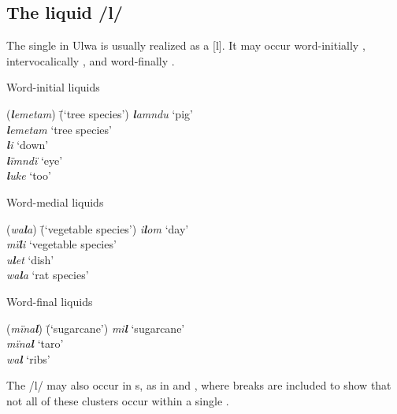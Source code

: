 
\subsection{The liquid /l/}\label{sec:2.1.5}


The single  in Ulwa is usually realized as a     [l]. It may occur word-initially , intervocalically , and word-finally .

\ea%
    \label{ex:phon:29}
          Word-initial liquids\\
\begin{tabbing}
{(\textit{\textbf{l}emetam})} \= {(‘tree species’)}\kill
{\textit{\textbf{l}amndu}} \> {‘pig’}\\
{\textit{\textbf{l}emetam}} \> {‘tree species’}\\
{\textit{\textbf{l}i}} \> {‘down’}\\
{\textit{\textbf{l}ïmndï}} \> {‘eye’}\\
{\textit{\textbf{l}uke}} \> {‘too’}
\end{tabbing}
\z

\ea%
    \label{ex:phon:30}
          Word-medial liquids\\
\begin{tabbing}
{(\textit{wa\textbf{l}a})} \= {(‘vegetable species’)}\kill
{\textit{i\textbf{l}om}} \> {‘day’}\\
{\textit{mï\textbf{l}i}} \> {‘vegetable species’}\\
{\textit{u\textbf{l}et}} \> {‘dish’}\\
{\textit{wa\textbf{l}a}} \> {‘rat species’}
\end{tabbing}
\z

\ea%
    \label{ex:phon:31}
          Word-final liquids\\
\begin{tabbing}
{(\textit{mïna\textbf{l}})} \= {(‘sugarcane’)}\kill
{\textit{mi\textbf{l}}} \> {‘sugarcane’}\\
{\textit{mïna\textbf{l}}} \> {‘taro’}\\
{\textit{wa\textbf{l}}} \> {‘ribs’}
\end{tabbing}
\z

The  /l/ may also occur in s, as in  and , where  breaks are included to show that not all of these clusters occur within a single .

